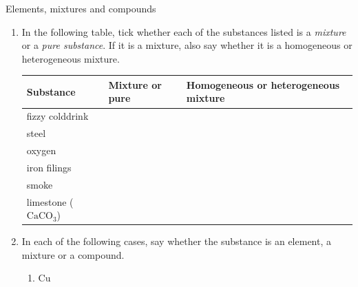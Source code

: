 \par \label{m38708*secfhsst!!!underscore!!!id212}
            \begin{exercises}{Elements, mixtures and compounds}{
            \nopagebreak
            \label{m38708*id63472}
 \begin{enumerate}[noitemsep, label=\textbf{\arabic*}. ] 
            \label{m38708*uid28}
    \item In the following table, tick whether each of the substances listed is a \textsl{mixture} or a \textsl{pure substance}. If it is a mixture, also say whether it is a homogeneous or heterogeneous mixture.
          \begin{table}[H]
        \begin{center}
      \label{m38708*id63499}
    \noindent
      \begin{tabular}{|l|l|l|}\hline
        \textbf{Substance} &
        \textbf{Mixture or pure} &
        \textbf{Homogeneous or heterogeneous mixture} \\ \hline
        fizzy colddrink & & \\ \hline
        steel & & \\ \hline
        oxygen & & \\ \hline
        iron filings & & \\ \hline
        smoke & & \\ \hline
        limestone (${\mathrm{CaCO}}_{3}$) & & \\ \hline
    \end{tabular}
      \end{center}
\end{table}
    \par
\label{m38708*uid29}\item In each of the following cases, say whether the substance is an element, a mixture or a compound.
\label{m38708*id63912}\begin{enumerate}[noitemsep, label=\textbf{\alph*}. ] 
            \label{m38708*uid30}\item $\mathrm{Cu}$

\end{enumerate}
\end{enumerate}}
\end{exercises}
